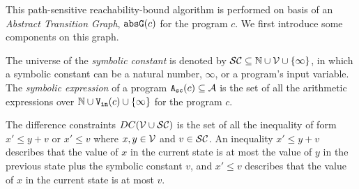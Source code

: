 This path-sensitive reachability-bound algorithm
is performed on basis of an \emph{Abstract Transition Graph}, $\mathtt{abs}{\mathtt{G}}(c)$
for the program $c$.
%
%
We first introduce some components on this graph.
\begin{defn}
  \label{def:symbolic_expr}
The universe of the \emph{symbolic constant} is denoted by $\mathcal{SC} \subseteq \mathbb{N} \cup \mathcal{V} \cup \{\infty \}$, in which a symbolic constant can be a natural number, $\infty$, or a program's input variable.
 The \emph{symbolic expression} of a program ${\mathtt{A_{sc}}}(c) \subseteq \mathcal{A}$ is the set of all the arithmetic expressions over $\mathbb{N} \cup {\ensuremath{\mathtt{V_{\mathtt{in}}}}}(c) \cup \{\infty \}$ for the program $c$.
\end{defn}

\begin{defn}
 The difference constraints $DC(\mathcal{V}  \cup \mathcal{SC})$ is the set of all the inequality of
form $x' \leq y + v$ or $x' \leq v$ where $x, y \in \mathcal{V} $ and $v \in \mathcal{SC}$.
An inequality $x' \leq y + v$ describes that the value of $x$ in the current state is
at most the value of $y$ in the previous state plus the symbolic constant $v$, and $x' \leq v$ describes that the value of $x$ in the current state is
at most $v$.
\end{defn}

